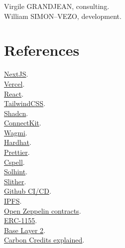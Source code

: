\documentclass[a4paper, 12pt]{article}
\begin{document}
Virgile GRANDJEAN, consulting.\\

William SIMON--VEZO, development.

\appendix
\section{References}

\href{https://nextjs.org/}{NextJS}.\\

\href{https://vercel.com/varadiells-projects}{Vercel}.\\

\href{https://fr.react.dev/}{React}.\\

\href{https://tailwindcss.com/}{TailwindCSS}.\\

\href{https://ui.shadcn.com/}{Shadcn}.\\

\href{https://docs.family.co/connectkit}{ConnectKit}.\\

\href{https://wagmi.sh/}{Wagmi}.\\

\href{https://hardhat.org/}{Hardhat}.\\

\href{https://prettier.io/}{Prettier}.\\

\href{https://cspell.org/}{Cspell}.\\

\href{https://github.com/protofire/solhint}{Solhint}.\\

\href{https://github.com/crytic/slither}{Slither}.\\

\href{https://resources.github.com/devops/ci-cd/}{Github CI/CD}.\\

\href{https://ipfs.tech/}{IPFS}.\\

\href{https://github.com/OpenZeppelin/openzeppelin-contracts}{Open Zeppelin contracts}.\\

\href{https://ethereum.org/fr/developers/docs/standards/tokens/erc-1155/}{ERC-1155}.\\

\href{https://www.base.org/}{Base Layer 2}.\\

\href{https://www.climateimpact.com/services-projects/carbon-credits-explained-what-they-are-and-how-they-work/}{Carbon Credits explained}.\\
\end{document}
